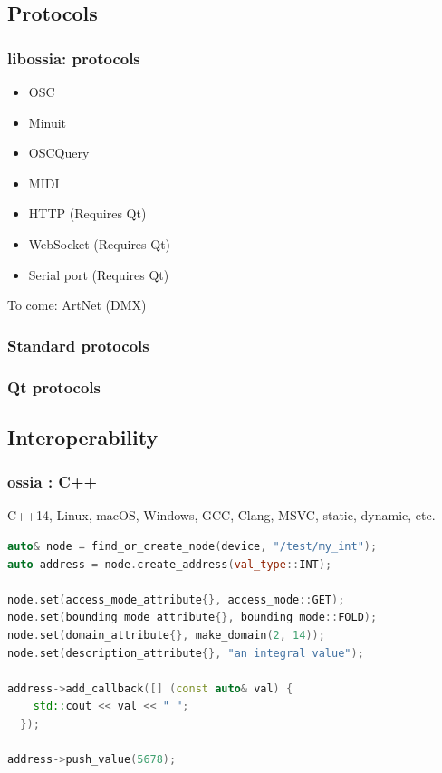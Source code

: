 \documentclass[handout]{beamer}
\begin{document}
\subsection{Protocols}
\begin{frame}
\frametitle{libossia: protocols}
\Large
\begin{itemize}
    \item{OSC}
    \item{Minuit}
    \item{OSCQuery}
    \item{MIDI}
    \item{HTTP (Requires Qt)}
    \item{WebSocket (Requires Qt)}
    \item{Serial port (Requires Qt)}
\end{itemize}

To come: ArtNet (DMX)
\end{frame}

\begin{frame}
\frametitle{Standard protocols}
\Large
\end{frame}


\begin{frame}
\frametitle{Qt protocols}
\Large
\end{frame}

\subsection{Interoperability}

\begin{frame}[fragile]
\frametitle{ossia : C++}

C++14, Linux, macOS, Windows, GCC, Clang, MSVC, static, dynamic, etc.
~\\
\footnotesize
\begin{lstlisting}[language=C++]
auto& node = find_or_create_node(device, "/test/my_int");
auto address = node.create_address(val_type::INT);

node.set(access_mode_attribute{}, access_mode::GET);
node.set(bounding_mode_attribute{}, bounding_mode::FOLD);
node.set(domain_attribute{}, make_domain(2, 14));
node.set(description_attribute{}, "an integral value");

address->add_callback([] (const auto& val) { 
    std::cout << val << " "; 
  });
  
address->push_value(5678);
\end{lstlisting}
\end{frame}
\end{document}
